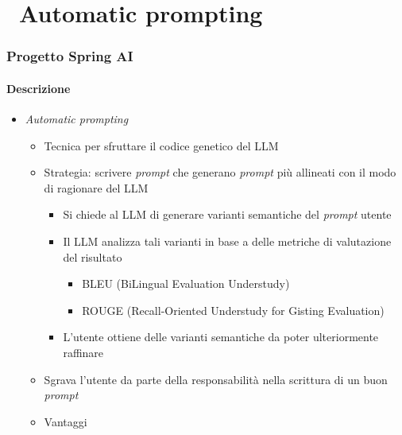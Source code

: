 \section{\faWrench\ Automatic prompting} %
\label{sec:spring-ai-gemini-automatic-prompting}
%
\begin{frame}[t,fragile] \frametitle{Progetto Spring AI}
    \framesubtitle{Descrizione}
    {\footnotesize
        \begin{itemize}[leftmargin=10pt,align=right]
            \item[\alertedcircled{1}] \textit{Automatic prompting}
            \begin{itemize}[leftmargin=10pt,align=right]
                \item[\alert{\faArrowCircleRight}] Tecnica per sfruttare il codice genetico del LLM
                \item[\alert{\faArrowCircleRight}] Strategia: scrivere \textit{prompt} che generano \textit{prompt} più allineati con il modo di ragionare del LLM
                \begin{itemize}[leftmargin=10pt,align=right]
                    \item[\alert{\faArrowCircleRight}] Si chiede al LLM di generare varianti semantiche del \textit{prompt} utente
                    \item[\alert{\faArrowCircleRight}] Il LLM analizza tali varianti in base a delle \alert{metriche di valutazione} del risultato
                    \begin{itemize}[leftmargin=10pt,align=right]
                        \item[\alert{\faArrowCircleRight}] \alert{BLEU} (\alert{B}i\alert{L}ingual \alert{E}valuation \alert{U}nderstudy)
                        \item[\alert{\faArrowCircleRight}] \alert{ROUGE} (\alert{R}ecall-\alert{O}riented \alert{U}nderstudy for \alert{G}isting \alert{E}valuation)
                    \end{itemize}
                    \item[\alert{\faArrowCircleRight}] L'utente ottiene delle varianti semantiche da poter ulteriormente raffinare
                \end{itemize}
                \item[\alert{\faExclamationTriangle}] Sgrava l'utente da parte della responsabilità nella scrittura di un buon \textit{prompt}
                \item[\alert{\faArrowCircleRight}] Vantaggi

\end{itemize}
\end{itemize}}
\end{frame}
